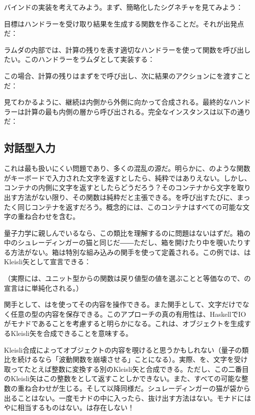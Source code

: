 バインドの実装を考えてみよう。まず、簡略化したシグネチャを見てみよう：

目標はハンドラーを受け取り結果を生成する関数を作ることだ。それが出発点だ：

ラムダの内部では、計算の残りを表す適切なハンドラーを使って関数を呼び出したい。このハンドラーをラムダとして実装する：

この場合、計算の残りはまずをで呼び出し、次に結果のアクションにを渡すことだ：

見てわかるように、継続は内側から外側に向かって合成される。最終的なハンドラーは計算の最も内側の層から呼び出される。完全なインスタンスは以下の通りだ：


\subsection{対話型入力}

これは最も扱いにくい問題であり、多くの混乱の源だ。明らかに、のような関数がキーボードで入力された文字を返すとしたら、純粋ではありえない。しかし、コンテナの内側に文字を返すとしたらどうだろう？そのコンテナから文字を取り出す方法がない限り、その関数は純粋だと主張できる。を呼び出すたびに、まったく同じコンテナを返すだろう。概念的には、このコンテナはすべての可能な文字の重ね合わせを含む。

量子力学に親しんでいるなら、この類比を理解するのに問題はないはずだ。箱の中のシュレーディンガーの猫と同じだ――ただし、箱を開けたり中を覗いたりする方法がない。箱は特別な組み込みの関手を使って定義される。この例では、はKleisli矢として宣言できる：

（実際には、ユニット型からの関数は戻り値型の値を選ぶことと等価なので、の宣言はに単純化される。）

関手として、はを使ってその内容を操作できる。また関手として、文字だけでなく任意の型の内容を保存できる。このアプローチの真の有用性は、HaskellでIOがモナドであることを考慮すると明らかになる。これは、オブジェクトを生成するKleisli矢を合成できることを意味する。

Kleisli合成によってオブジェクトの内容を覗けると思うかもしれない（量子の類比を続けるなら「波動関数を崩壊させる」ことになる）。実際、を、文字を受け取ってたとえば整数に変換する別のKleisli矢と合成できる。ただし、この二番目のKleisli矢はこの整数をとして返すことしかできない。また、すべての可能な整数の重ね合わせが生じる。そして以降同様だ。シュレーディンガーの猫が袋から出ることはない。一度モナドの中に入ったら、抜け出す方法はない。モナドにはやに相当するものはない。は存在しない！

